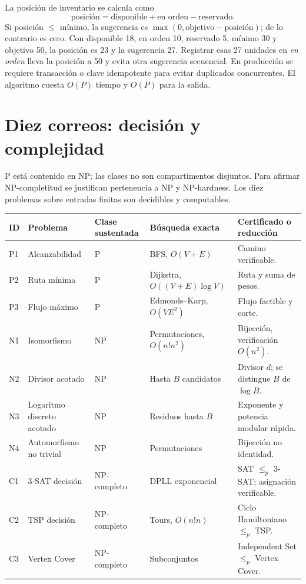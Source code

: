 \documentclass[11pt,a4paper]{article}
\begin{document}
La posición de inventario se calcula como
\[
\text{posición}=\text{disponible}+\text{en orden}-\text{reservado}.
\]
Si posición $\leq$ mínimo, la sugerencia es $\max(0,\text{objetivo}-\text{posición})$; de lo contrario es cero. Con disponible 18, en orden 10, reservado 5, mínimo 30 y objetivo 50, la posición es 23 y la sugerencia 27. Registrar esas 27 unidades en \emph{en orden} lleva la posición a 50 y evita otra sugerencia secuencial. En producción se requiere transacción o clave idempotente para evitar duplicados concurrentes. El algoritmo cuesta $O(P)$ tiempo y $O(P)$ para la salida.

\section{Diez correos: decisión y complejidad}

P está contenido en NP; las clases no son compartimentos disjuntos. Para afirmar NP-completitud se justifican pertenencia a NP y NP-hardness. Los diez problemas sobre entradas finitas son decidibles y computables.

\begin{longtable}{@{}p{1cm}p{3cm}p{2.2cm}p{3.2cm}p{4.2cm}@{}}
\toprule
ID & Problema & Clase sustentada & Búsqueda exacta & Certificado o reducción \\ \midrule
\endhead
P1 & Alcanzabilidad & P & BFS, $O(V+E)$ & Camino verificable.\\
P2 & Ruta mínima & P & Dijkstra, $O((V+E)\log V)$ & Ruta y suma de pesos.\\
P3 & Flujo máximo & P & Edmonds--Karp, $O(VE^2)$ & Flujo factible y corte.\\
N1 & Isomorfismo & NP & Permutaciones, $O(n!n^2)$ & Bijección, verificación $O(n^2)$.\\
N2 & Divisor acotado & NP & Hasta $B$ candidatos & Divisor $d$; se distingue $B$ de $\log B$.\\
N3 & Logaritmo discreto acotado & NP & Residuos hasta $B$ & Exponente y potencia modular rápida.\\
N4 & Automorfismo no trivial & NP & Permutaciones & Bijección no identidad.\\
C1 & 3-SAT decisión & NP-completo & DPLL exponencial & SAT $\leq_p$ 3-SAT; asignación verificable.\\
C2 & TSP decisión & NP-completo & Tours, $O(n!n)$ & Ciclo Hamiltoniano $\leq_p$ TSP.\\
C3 & Vertex Cover & NP-completo & Subconjuntos & Independent Set $\leq_p$ Vertex Cover.\\
\bottomrule
\end{longtable}
\end{document}
